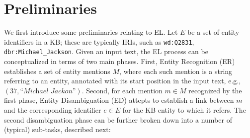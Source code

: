 \documentclass{llncs}
\begin{document}


\section{Preliminaries}
\label{subsect:preliminaries}

We first introduce some preliminaries relating to EL. Let $E$ be a set of entity identifiers in a KB; these are typically IRIs, such as \texttt{wd:Q2831}, \texttt{dbr:Michael\_Jackson}. Given an input text, the EL process can be conceptualized in terms of two main phases. First, Entity Recognition (ER) establishes a set of entity mentions $M$, where each such mention is a string referring to an entity, annotated with its start position in the input text, e.g., $(37,\textit{``Michael Jackon''})$. Second, for each mention $m\in{}M$ recognized by the first phase, Entity Disambiguation (ED) attepts to establish a link between $m$ and the corresponding identifier $e\in{}E$ for the KB entity to which it refers. The second disambiguation phase can be further broken down into a number of (typical) sub-tasks, described next:
\end{document}
